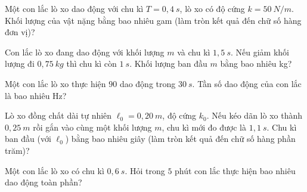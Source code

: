 \begin{ex}
Một con lắc lò xo dao động với chu kì $T = 0,4\ s$, lò xo có độ cứng $k = 50\ N/m$. Khối lượng của vật nặng bằng bao nhiêu gam (làm tròn kết quả đến chữ số hàng đơn vị)?

\end{ex}

\begin{ex}
Con lắc lò xo đang dao động với khối lượng $m$ và chu kì $1,5\ s$. Nếu giảm khối lượng đi $0,75\ kg$ thì chu kì còn $1\ s$. Khối lượng ban đầu $m$ bằng bao nhiêu kg?
\loigiai{}
\end{ex}

\begin{ex}
Một con lắc lò xo thực hiện $90$ dao động trong $30\ s$. Tần số dao động của con lắc là bao nhiêu Hz?
\loigiai{}
\end{ex}

\begin{ex}
Lò xo đồng chất dài tự nhiên $\ell_0 = 0,20\ m$, độ cứng $k_0$. Nếu kéo dãn lò xo thành $0,25\ m$ rồi gắn vào cùng một khối lượng $m$, chu kì mới đo được là $1,1\ s$. Chu kì ban đầu (với $\ell_0$) bằng bao nhiêu giây (làm tròn kết quả đến chữ số hàng phần trăm)?
\loigiai{}
\end{ex}

\begin{ex}
Một con lắc lò xo có chu kì $0,6\ s$. Hỏi trong $5$ phút con lắc thực hiện bao nhiêu dao động toàn phần?
\loigiai{}
\end{ex}

